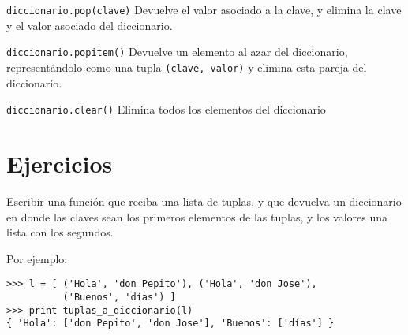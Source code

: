 \begin{referencia_python}
\begin{sintaxis}{\lstinline{diccionario.pop(clave)}}
Devuelve el valor asociado a la clave, y elimina la clave y el valor
asociado del diccionario.
\end{sintaxis}

\begin{sintaxis}{\lstinline{diccionario.popitem()}}
Devuelve un elemento al azar del diccionario, representándolo como una
tupla \lstinline{(clave, valor)} y elimina esta pareja del diccionario.
\end{sintaxis}

\begin{sintaxis}{\lstinline{diccionario.clear()}}
Elimina todos los elementos del diccionario
\end{sintaxis}

%
%

\end{referencia_python}


\newpage
\section{Ejercicios}

\begin{ejercicio}
Escribir una función que reciba una lista de tuplas, y que devuelva
un diccionario en donde las claves sean los primeros elementos de las
tuplas, y los valores una lista con los segundos.

Por ejemplo:
\begin{lstlisting}[numbers=none]
>>> l = [ ('Hola', 'don Pepito'), ('Hola', 'don Jose'),
          ('Buenos', 'días') ]
>>> print tuplas_a_diccionario(l)
{ 'Hola': ['don Pepito', 'don Jose'], 'Buenos': ['días'] }
\end{lstlisting}
\end{ejercicio}

